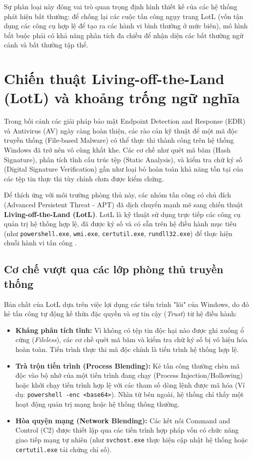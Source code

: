 ﻿\documentclass[../main.tex]{subfiles}
\begin{document}
Sự phân loại này đóng vai trò quan trọng định hình thiết kế của các hệ thống phát hiện bất thường: để chống lại các cuộc tấn công ngụy trang LotL (vốn tận dụng các công cụ hợp lệ để tạo ra các hành vi bình thường ở mức biên), mô hình bắt buộc phải có khả năng phân tích đa chiều để nhận diện các bất thường ngữ cảnh và bất thường tập thể.

\section{Chiến thuật Living-off-the-Land (LotL) và khoảng trống ngữ nghĩa}
\label{section:1.4}

Trong bối cảnh các giải pháp bảo mật Endpoint Detection and Response (EDR) và Antivirus (AV) ngày càng hoàn thiện, các rào cản kỹ thuật để một mã độc truyền thống (File-based Malware) có thể thực thi thành công trên hệ thống Windows đã trở nên vô cùng khắt khe. Các cơ chế như quét mã băm (Hash Signature), phân tích tĩnh cấu trúc tệp (Static Analysis), và kiểm tra chữ ký số (Digital Signature Verification) gần như loại bỏ hoàn toàn khả năng tồn tại của các tệp tin thực thi tùy chỉnh chưa được kiểm chứng.

Để thích ứng với môi trường phòng thủ này, các nhóm tấn công có chủ đích (Advanced Persistent Threat - APT) đã dịch chuyển mạnh mẽ sang chiến thuật \textbf{Living-off-the-Land (LotL)}. LotL là kỹ thuật sử dụng trực tiếp các công cụ quản trị hệ thống hợp lệ, đã được ký số và có sẵn trên hệ điều hành mục tiêu (như \texttt{powershell.exe}, \texttt{wmi.exe}, \texttt{certutil.exe}, \texttt{rundll32.exe}) để thực hiện chuỗi hành vi tấn công \cite{hassan2020tactical}. 

\subsection{Cơ chế vượt qua các lớp phòng thủ truyền thống}
Bản chất của LotL dựa trên việc lợi dụng các tiến trình "lõi" của Windows, do đó kẻ tấn công tự động kế thừa đặc quyền và sự tin cậy (\textit{Trust}) từ hệ điều hành:
\begin{itemize}
    \item \textbf{Kháng phân tích tĩnh:} Vì không có tệp tin độc hại nào được ghi xuống ổ cứng (\textit{Fileless}), các cơ chế quét mã băm và kiểm tra chữ ký số bị vô hiệu hóa hoàn toàn. Tiến trình thực thi mã độc chính là tiến trình hệ thống hợp lệ.
    \item \textbf{Trà trộn tiến trình (Process Blending):} Kẻ tấn công thường chèn mã độc vào bộ nhớ của một tiến trình đang chạy (Process Injection/Hollowing) hoặc khởi chạy tiến trình hợp lệ với các tham số dòng lệnh được mã hóa (Ví dụ: \texttt{powershell -enc <base64>}). Nhìn từ bên ngoài, hệ thống chỉ thấy một hoạt động quản trị mạng hoặc hệ thống thông thường.
    \item \textbf{Hòa quyện mạng (Network Blending):} Các kết nối Command and Control (C2) được thiết lập qua các tiến trình hợp pháp vốn có chức năng giao tiếp mạng tự nhiên (như \texttt{svchost.exe} thực hiện cập nhật hệ thống hoặc \texttt{certutil.exe} tải chứng chỉ số).
\end{itemize}
\end{document}
